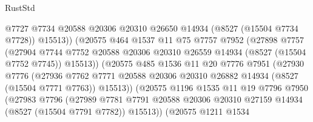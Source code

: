 \begin{lexlean}{RustStd}
\begin{coremodule}
                            @7727
                            @7734
                            @20588
                            @20306
                            @20310
                            @26650
                            @14934
                            (@8527 (@15504 @7734 @7728))
                            @15513))
                        (@20575
                          @464
                          @1537
                          @11
                          @75
                          @7757
                          @7952
                          (@27898
                            @7757
                            (@27904
                              @7744
                              @7752
                              @20588
                              @20306
                              @20310
                              @26559
                              @14934
                              (@8527 (@15504 @7752 @7745))
                              @15513))
                          (@20575
                            @485
                            @1536
                            @11
                            @20
                            @7776
                            @7951
                            (@27930
                              @7776
                              (@27936
                                @7762
                                @7771
                                @20588
                                @20306
                                @20310
                                @26882
                                @14934
                                (@8527 (@15504 @7771 @7763))
                                @15513))
                            (@20575
                              @1196
                              @1535
                              @11
                              @19
                              @7796
                              @7950
                              (@27983
                                @7796
                                (@27989
                                  @7781
                                  @7791
                                  @20588
                                  @20306
                                  @20310
                                  @27159
                                  @14934
                                  (@8527 (@15504 @7791 @7782))
                                  @15513))
                              (@20575
                                @1211
                                @1534

\end{coremodule}
\end{lexlean}
